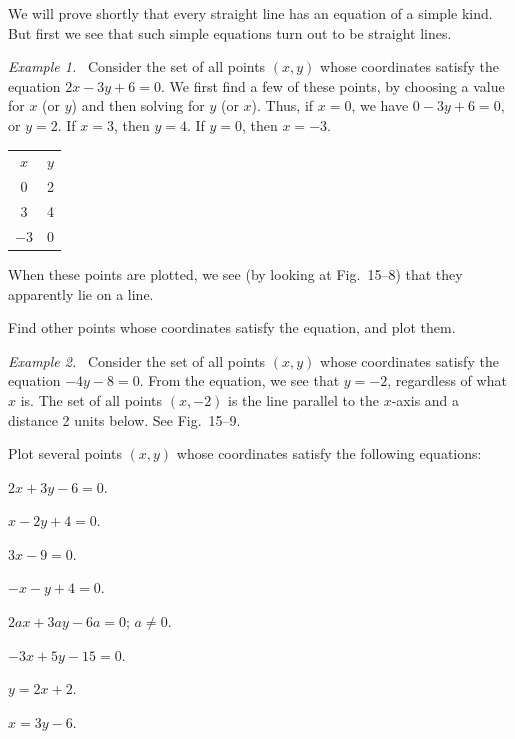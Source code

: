 \documentclass[11pt]{book}
\theoremstyle{bkplain}
\theoremstyle{XIplainnote}
\theoremstyle{bkplain}
\theoremstyle{bkplain}
\newenvironment{XVexample}[1][]{\par\medskip\noindent\emph{Example#1.}\ }{\par\medskip}
\begin{document}
We will prove shortly that every straight line has an equation of a simple
kind. But first we see that such simple equations turn out to be straight
lines.

\begin{XVexample}[ 1]
Consider the set of all points $(x, y)$ whose coordinates satisfy the equation
$2x - 3y + 6 = 0$. We first find a few of these points, by choosing a value
for $x$ (or $y$) and then solving for $y$ (or $x$). Thus, if $x = 0$, we have
$0 - 3y + 6 = 0$, or $y = 2$. If $x = 3$, then $y = 4$. If $y = 0$, then
$x = -3$.
\par\medskip
\begin{center}
\begin{tabular}{c|c}
\multicolumn{1}{c}{$x$} & \multicolumn{1}{c}{$y$} \\
0 & 2 \\
3 & 4 \\
$-3$ & 0 \\
\end{tabular}
\end{center}
\end{XVexample}

\FIGXVEIGHTNINE

When these points are plotted, we see (by looking at Fig.~15--8) that they
apparently lie on a line.

Find other points whose coordinates satisfy the equation, and plot them.

\begin{XVexample}[ 2]
Consider the set of all points $(x, y)$ whose coordinates satisfy the equation
$-4y - 8 = 0$. From the equation, we see that $y = -2$, regardless of what $x$
is. The set of all points $(x, -2)$ is the line parallel to the $x$-axis and a
distance 2 units below. See Fig.~15--9.
\end{XVexample}

Plot several points $(x, y)$ whose coordinates satisfy the following
equations:
\begin{exercisecols}
\begin{exlist}
\item $2x + 3y - 6 = 0$.
\item $x - 2y + 4 = 0$.
\item $3x - 9 = 0$.
\item $-x - y + 4 = 0$.
\item $2ax + 3ay - 6a = 0$; $a \neq 0$.
\item $-3x + 5y - 15 = 0$.
\item $y = 2x + 2$.
\item $x = 3y - 6$.
\end{exlist}
\end{exercisecols}
\end{document}
